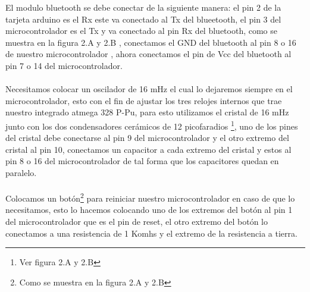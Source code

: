\documentclass[12]{article}
\begin{document}
\begin{multicols}{2}
El modulo bluetooth se debe conectar de la siguiente manera: el pin 2 de la tarjeta arduino es el Rx este va conectado al Tx del blueetooth, el pin 3 del microcontrolador es el Tx y va conectado al pin Rx del bluetooth, como se muestra en la figura 2.A y 2.B , conectamos el GND del bluetooth al pin 8  o 16 de nuestro microcontrolador , ahora conectamos el pin de Vcc del bluetooth al pin 7 o 14 del microcontrolador. \\\\
Necesitamos colocar un oscilador de 16 mHz el cual lo dejaremos siempre en el microcontrolador, esto  con el fin de ajustar los tres relojes internos que trae nuestro integrado atmega 328 P-Pu, para esto utilizamos el cristal de 16 mHz junto con los dos condensadores cerámicos de 12 picofaradios \footnote{Ver figura 2.A y 2.B}, uno de los pines del cristal debe conectarse al pin 9 del microcontrolador y el otro extremo del cristal al pin 10, conectamos un capacitor a cada extremo del cristal y estos al pin 8 o 16 del microcontrolador de tal forma que los capacitores quedan en paralelo. \\\\
Colocamos un botón\footnote{Como se muestra en la figura 2.A y 2.B} para reiniciar nuestro microcontrolador en caso de que lo necesitamos, esto lo hacemos colocando uno de los extremos del botón al pin 1 del microcontrolador que es el pin de reset, el otro extremo del botón lo conectamos a una resistencia de 1 Komhs y el extremo de la resistencia a tierra.


\end{multicols}
\end{document}
